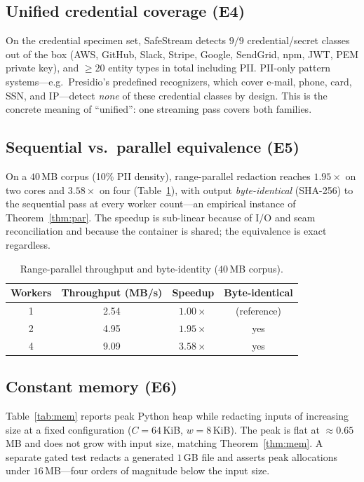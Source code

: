 \documentclass[conference]{IEEEtran}
\begin{document}
\subsection{Unified credential coverage (E4)}

On the credential specimen set, SafeStream detects $9/9$ credential/secret classes
out of the box (AWS, GitHub, Slack, Stripe, Google, SendGrid, npm, JWT, PEM private
key), and $\geq20$ entity types in total including PII. PII-only pattern
systems---e.g.\ Presidio's predefined recognizers, which cover e-mail, phone,
card, SSN, and IP---detect \emph{none} of these credential classes by design. This
is the concrete meaning of ``unified'': one streaming pass covers both families.

\subsection{Sequential vs.\ parallel equivalence (E5)}

On a $40$\,MB corpus (10\% PII density), range-parallel redaction reaches
$1.95\times$ on two cores and $3.58\times$ on four (Table~\ref{tab:parallel}),
with output \emph{byte-identical} (SHA-256) to the sequential pass at every worker
count---an empirical instance of Theorem~\ref{thm:par}. The speedup is sub-linear
because of I/O and seam reconciliation and because the container is shared; the
equivalence is exact regardless.

\begin{table}[t]
\centering
\caption{Range-parallel throughput and byte-identity ($40$\,MB corpus).}
\label{tab:parallel}
\footnotesize
\begin{tabular}{@{}cccc@{}}
\toprule
Workers & Throughput (MB/s) & Speedup & Byte-identical \\
\midrule
1 & 2.54 & $1.00\times$ & (reference) \\
2 & 4.95 & $1.95\times$ & yes \\
4 & 9.09 & $3.58\times$ & yes \\
\bottomrule
\end{tabular}
\end{table}

\subsection{Constant memory (E6)}

Table~\ref{tab:mem} reports peak Python heap while redacting inputs of increasing
size at a fixed configuration ($C{=}64$\,KiB, $w{=}8$\,KiB). The peak is flat at
$\approx0.65$\,MB and does not grow with input size, matching
Theorem~\ref{thm:mem}. A separate gated test redacts a generated $1$\,GB file and
asserts peak allocations under $16$\,MB---four orders of magnitude below the input
size.
\end{document}
